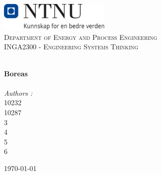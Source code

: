 
\begin{titlepage}
\vbox{ }
\vbox{ }
\begin{center}
\includegraphics[width=0.40\textwidth]{Images/NTNU_logo.png}\\[1cm]
\textsc{\LARGE Department of Energy and Process Engineering}\\[1.5cm]
\textsc{\Large INGA2300 - Engineering Systems Thinking}\\[0.5cm]
\vbox{ }

\HRule \\[0.4cm]
{ \huge \bfseries Boreas}\\[0.4cm]
\HRule \\[1.5cm]

\large
\emph{Authors :}\\ %
10232 \\
10287 \\
3 \\
4 \\
5 \\
6 \\

\vfill

{\large \today}
\end{center}
\end{titlepage}